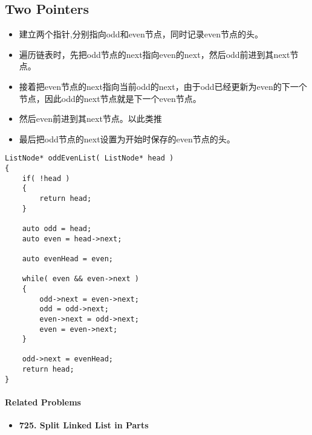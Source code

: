 \subsection{Two Pointers}
\begin{itemize}
\item 建立两个指针,分别指向odd和even节点，同时记录even节点的头。
\item 遍历链表时，先把odd节点的next指向even的next，然后odd前进到其next节点。
\item 接着把even节点的next指向当前odd的next，由于odd已经更新为even的下一个节点，因此odd的next节点就是下一个even节点。
\item 然后even前进到其next节点。以此类推
\item 最后把odd节点的next设置为开始时保存的even节点的头。
\end{itemize}

\setcounter{lstlisting}{0}
\begin{lstlisting}[style=customc, caption={Two Pointers}]
ListNode* oddEvenList( ListNode* head )
{
    if( !head )
    {
        return head;
    }

    auto odd = head;
    auto even = head->next;

    auto evenHead = even;

    while( even && even->next )
    {
        odd->next = even->next;
        odd = odd->next;
        even->next = odd->next;
        even = even->next;
    }

    odd->next = evenHead;
    return head;
}
\end{lstlisting}

\paragraph{Related Problems}
\begin{itemize}
\item \textbf{725. Split Linked List in Parts}
\end{itemize}